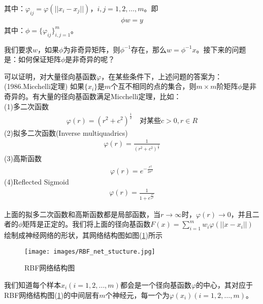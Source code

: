             其中：$\varphi_{ij} = \varphi(||x_i-x_j||)$，$i,j=1,2,\dots,m$。即
            \begin{align*}
            \phi w = y
            \end{align*}
            其中：$\phi = \{\varphi_{ij}\}_{i,j=1}^m$。
            \par
            我们要求$w$，如果$\phi$为非奇异矩阵，则$\phi^{-1}$存在，那么$w = \phi^{-1}x$。接下来的问题是：如何保证矩阵$\phi$是非奇异的呢？
            \par
            可以证明，对大量径向基函数$\varphi$，在某些条件下，上述问题的答案为：(1986.Micchelli定理)
            如果$\{x_i\}$是$m$个互不相同的点的集合，则$m\times m$阶矩阵$\phi$是非奇异的。有大量的径向基函数满足Micchelli定理，比如：\\
            (1)多二次函数
            \begin{align*}
            \varphi(r) = (r^2+c^2)^\frac{1}{2} \quad \text{对某些}c>0,r\in R
            \end{align*}
            (2)拟多二次函数(Inverse multiquadrics)
            \begin{align*}
            \varphi(r) = \frac{1}{(r^2+c^2)^\frac{1}{2}}
            \end{align*}
            (3)高斯函数
            \begin{align*}
            \varphi(r) = e^{-\frac{r^2}{2\sigma^2}}
            \end{align*}
            (4)Reflected Sigmoid
            \begin{align*}
            \varphi(r)=\frac{1}{1+e^{\frac{r^2}{\sigma^2}}}
            \end{align*}
            \par
            上面的拟多二次函数和高斯函数都是局部函数，当$r\rightarrow \infty$时，$\varphi(r)\rightarrow 0$，并且二者的$\phi$矩阵是正定的。我们将上面的径向基函数$F(x) = \sum\limits_{i=1}^mw_i\varphi(||x-x_i||)$绘制成神经网络的形状，其网络结构图如图(\ref{fig:RBF网络结构图})所示
            \begin{figure}[H]
            \centering
            \texttt{[image: images/RBF\_net\_stucture.jpg]}
            \caption{RBF网络结构图}
            \label{fig:RBF网络结构图}
            \end{figure}
            我们知道每个样本$x_i(i=1,2,\dots,m)$都会是一个径向基函数$\varphi$的中心，其对应于RBF网络结构图(\ref{fig:RBF网络结构图})的中间层有$m$个神经元，每一个为$\varphi(x_i)(i=1,2,\dots,m)$。
